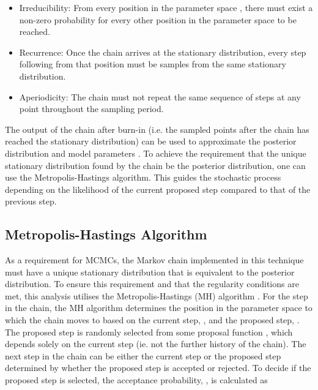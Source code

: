\begin{itemize}
\item Irreducibility: From every position in the parameter space , there must exist a non-zero probability for every other position in the parameter space to be reached.
\item Recurrence: Once the chain arrives at the stationary distribution, every step following from that position must be samples from the same stationary distribution.
\item Aperiodicity: The chain must not repeat the same sequence of steps at any point throughout the sampling period.
\end{itemize}

The output of the chain after burn-in (i.e. the sampled points after the chain has reached the stationary distribution) can be used to approximate the posterior distribution and model parameters \quickmath{\vec{\theta}}. To achieve the requirement that the unique stationary distribution found by the chain be the posterior distribution, one can use the Metropolis-Hastings algorithm. This guides the stochastic process depending on the likelihood of the current proposed step compared to that of the previous step. %

\subsection{Metropolis-Hastings Algorithm}
\label{sec:MarkovChainMonteCarlo_MetropoliseHastingsAlgorithm}

As a requirement for MCMCs, the Markov chain implemented in this technique must have a unique stationary distribution that is equivalent to the posterior distribution. To ensure this requirement and that the regularity conditions are met, this analysis utilises the Metropolis-Hastings (MH) algorithm \cite{metropolis, hastings}. For the  step in the chain, the MH algorithm determines the position in the parameter space to which the chain moves to based on the current step, , and the proposed step, . The proposed step is randomly selected from some proposal function , which depends solely on the current step (ie. not the further history of the chain). The next step in the chain  can be either the current step or the proposed step determined by whether the proposed step is accepted or rejected. To decide if the proposed step is selected, the acceptance probability, , is calculated as

